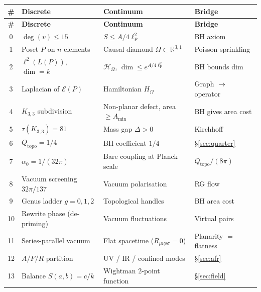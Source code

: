 \documentclass[11pt]{article}
\newcommand{\Kthree}{K_{3,3}}
\newcommand{\hilb}{\mathscr{H}}
\newcommand{\lP}{\ell_{\mathrm{P}}}
\begin{document}
\bigskip
\renewcommand{\arraystretch}{1.5}
\begin{longtable}{@{}clll@{}}
\toprule
\textbf{\#} & \textbf{Discrete} & \textbf{Continuum} & \textbf{Bridge} \\
\midrule
\endfirsthead
\toprule
\textbf{\#} & \textbf{Discrete} & \textbf{Continuum} & \textbf{Bridge} \\
\midrule
\endhead

0 & $\deg(v) \le 15$ &
  $S \le A/4\lP^2$ &
  BH axiom \\

1 & Poset $P$ on $n$ elements &
  Causal diamond $\Omega \subset \mathbb{R}^{3,1}$ &
  Poisson sprinkling \\

2 & $\ell^2(L(P))$, $\dim = k$ &
  $\hilb_\Omega$, $\dim \le e^{A/4\lP^2}$ &
  BH bounds dim \\

3 & Laplacian of $\mathcal{E}(P)$ &
  Hamiltonian $H_\Omega$ &
  Graph $\to$ operator \\

4 & $\Kthree$ subdivision &
  Non-planar defect, area $\ge A_{\min}$ &
  BH gives area cost \\

5 & $\tau(\Kthree) = 81$ &
  Mass gap $\Delta > 0$ &
  Kirchhoff \\

6 & $Q_{\mathrm{topo}} = 1/4$ &
  BH coefficient $1/4$ &
  \S\ref{sec:quarter} \\

7 & $\alpha_0 = 1/(32\pi)$ &
  Bare coupling at Planck scale &
  $Q_{\mathrm{topo}}/(8\pi)$ \\

8 & Vacuum screening $32\pi/137$ &
  Vacuum polarisation &
  RG flow \\

9 & Genus ladder $g = 0,1,2$ &
  Topological handles &
  BH area cost \\

10 & Rewrite phase (de-priming) &
  Vacuum fluctuations &
  Virtual pairs \\

11 & Series-parallel vacuum &
  Flat spacetime ($R_{\mu\nu\rho\sigma} = 0$) &
  Planarity $=$ flatness \\

12 & $A/F/R$ partition &
  UV / IR / confined modes &
  \S\ref{sec:afr} \\

13 & Balance $S(a,b) = c/k$ &
  Wightman 2-point function &
  \S\ref{sec:field} \\


\end{longtable}
\end{document}
